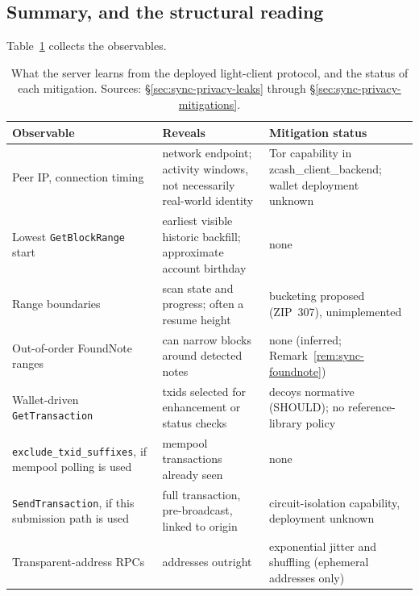 \documentclass[11pt,a4paper]{article}
\theoremstyle{definition}
\begin{document}
\subsection{Summary, and the structural reading}
\label{sec:sync-privacy-close}

Table~\ref{tab:sync-privacy-summary} collects the observables.

\begin{table}[htbp]
\centering\small
\begin{tabular}{@{}p{}p{}p{}@{}}
\toprule
Observable & Reveals & Mitigation status\\
\midrule
Peer IP, connection timing &
network endpoint; activity windows, not necessarily real-world identity &
Tor capability in \textsf{zcash\_client\_backend}; wallet deployment
unknown\\
\addlinespace
Lowest \texttt{GetBlockRange} start &
earliest visible historic backfill; approximate account birthday &
none\\
\addlinespace
Range boundaries &
scan state and progress; often a resume height &
bucketing proposed (ZIP~307), unimplemented\\
\addlinespace
Out-of-order \textsf{FoundNote} ranges &
can narrow blocks around detected notes &
none (inferred; Remark~\ref{rem:sync-foundnote})\\
\addlinespace
Wallet-driven \texttt{GetTransaction} &
txids selected for enhancement or status checks &
decoys normative (SHOULD); no reference-library policy\\
\addlinespace
\texttt{exclude\_txid\_suffixes}, if mempool polling is used &
mempool transactions already seen &
none\\
\addlinespace
\texttt{SendTransaction}, if this submission path is used &
full transaction, pre-broadcast, linked to origin &
circuit-isolation capability, deployment unknown\\
\addlinespace
Transparent-address RPCs &
addresses outright &
exponential jitter and shuffling (ephemeral addresses only)\\
\bottomrule
\end{tabular}
\caption{What the server learns from the deployed light-client protocol,
and the status of each mitigation. Sources: \S\ref{sec:sync-privacy-leaks}
through \S\ref{sec:sync-privacy-mitigations}.}
\label{tab:sync-privacy-summary}
\end{table}
\end{document}
